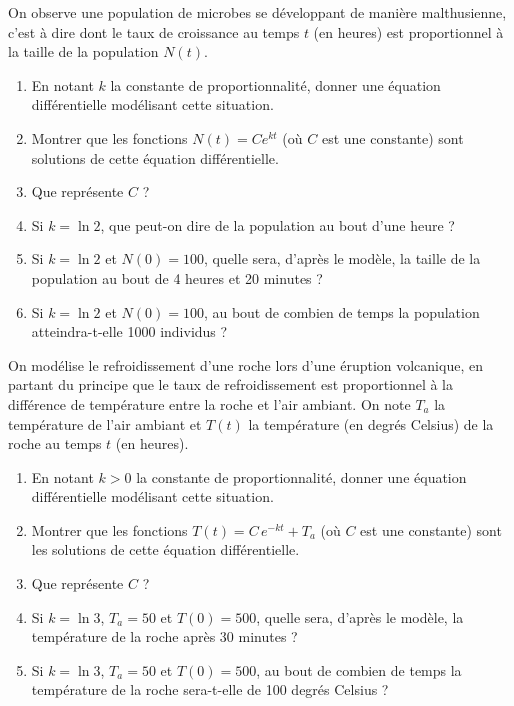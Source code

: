 \begin{exo}
    On observe une population de microbes se développant de manière malthusienne, c'est à dire dont le taux de croissance au temps $t$ (en heures) est proportionnel à la taille de la population $N(t)$.
    \begin{enumerate}
        \item
        En notant $k$ la constante de proportionnalité, donner une équation différentielle modélisant cette situation.
        \item
        Montrer que les fonctions $N(t) = Ce^{kt}$ (où $C$ est une constante) sont solutions de cette équation différentielle.
        \item
        Que représente $C$ ?
        \item
        Si $k= \ln 2$, que peut-on dire de la population au bout d'une heure ?
        \item
        Si $k = \ln 2$ et $N(0)=100$, quelle sera, d'après le modèle, la taille de la population au bout de 4 heures et 20 minutes ?
        \item
        Si $k = \ln 2$ et $N(0)=100$, au bout de combien de temps la population atteindra-t-elle 1000 individus ?
    \end{enumerate}
\end{exo}

\begin{exo}
    On modélise le refroidissement d'une roche lors d'une éruption volcanique, en partant du principe que le taux de refroidissement est proportionnel à la différence de température entre la roche et l'air ambiant.
    On note $T_{a}$ la température de l'air ambiant et $T(t)$ la température (en degrés Celsius) de la roche au temps $t$ (en heures).
    \begin{enumerate}
        \item
        En notant $k>0$ la constante de proportionnalité, donner une équation différentielle modélisant cette situation.
        \item
        Montrer que les fonctions $T(t) = C\,e^{-kt}+T_{a}$ (où $C$ est une constante) sont les solutions de cette équation différentielle.
        \item
        Que représente $C$ ?
        \item
        Si $k=\ln 3$, $T_{a} = 50$ et $T(0) = 500$, quelle sera, d'après le modèle, la température de la roche après 30 minutes ?
        \item
        Si $k=\ln 3$, $T_{a} = 50$ et $T(0) = 500$, au bout de combien de temps la température de la roche sera-t-elle de 100 degrés Celsius ?
    \end{enumerate}
\end{exo}


